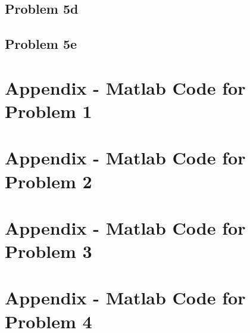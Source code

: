 {{{\subsection*{Problem 5d}

\subsection*{Problem 5e}






\newpage
\section{Appendix - Matlab Code for Problem 1}
\label{appendix:problem1}





\newpage
\section{Appendix - Matlab Code for Problem 2}
\label{appendix:problem2}





\newpage
\section{Appendix - Matlab Code for Problem 3}
\label{appendix:problem3}





\newpage
\section{Appendix - Matlab Code for Problem 4}
\label{appendix:problem4}





}}}
